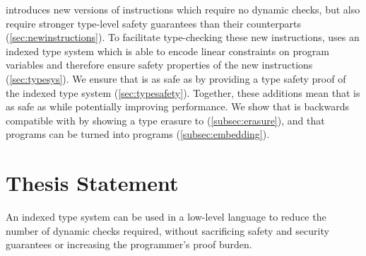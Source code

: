 \name introduces new versions of \wasm instructions which require no dynamic checks, but also require stronger type-level safety guarantees than their \wasm counterparts (\autoref{sec:newinstructions}).
To facilitate type-checking these new instructions, \name uses an indexed type system which is able to encode linear constraints on program variables and therefore ensure safety properties of the new \name instructions (\autoref{sec:typesys}).
We ensure that \name is as safe as \wasm by providing a type safety proof of the \name indexed type system (\autoref{sec:typesafety}).
Together, these additions mean that \name is as safe as \wasm while potentially improving performance.
We show that \name is backwards compatible with \wasm by showing a type erasure to \wasm (\autoref{subsec:erasure}), and that \wasm programs can be turned into \name programs (\autoref{subsec:embedding}).

\section{Thesis Statement}
\begin{adjustwidth}{1cm}{1cm}
    An indexed type system can be used in a low-level language to reduce the number of dynamic checks required, without sacrificing safety and security guarantees or increasing the programmer's proof burden.
\end{adjustwidth}
